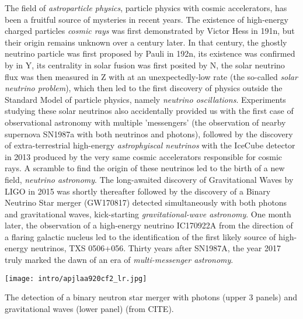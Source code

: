 The field of \emph{astroparticle physics}, particle physics with cosmic accelerators, has been a fruitful source of mysteries in recent years. The existence of high-energy charged particles \emph{cosmic rays} was first demonstrated by Victor Hess in 191n, but their origin remains unknown over a century later. In that century, the ghostly neutrino particle was first proposed by Pauli in 192n, its existence was confirmed by in Y, its centrality in solar fusion was first posited by N, the solar neutrino flux was then measured in Z with at an unexpectedly-low rate (the so-called \emph{solar neutrino problem}), which then led to the first discovery of physics outside the Standard Model of particle physics, namely \emph{neutrino oscillations}. Experiments studying these solar neutrinos also accidentally provided us with the first case of observational astronomy with multiple 'messengers' (the observation of nearby supernova SN1987a with both neutrinos and photons), followed by the discovery of extra-terrestrial high-energy \emph{astrophyiscal neutrinos} with the IceCube detector in 2013 produced by the very same cosmic accelerators responsible for cosmic rays. A scramble to find the origin of these neutrinos led to the birth of a new field, \emph{neutrino astronomy}. The long-awaited discovery of Gravitational Waves by LIGO in 2015 was shortly thereafter followed by the discovery of a Binary Neutrino Star merger (GW170817) detected simultaneously with both photons and gravitational waves, kick-starting \emph{gravitational-wave astronomy}. One month later, the observation of a high-energy neutrino IC170922A from the direction of a flaring galactic nucleus led to the identification of the first likely source of high-energy neutrinos, TXS 0506+056. Thirty years after SN1987A, the year 2017 truly marked the dawn of an era of \emph{multi-messenger astronomy}. 


\begin{marginfigure}
	\centering \texttt{[image: intro/apjlaa920cf2\_lr.jpg]}
	\caption{The detection of a binary neutron star merger with photons (upper 3 panels) and gravitational waves (lower panel)  (from CITE).}
\end{marginfigure}

